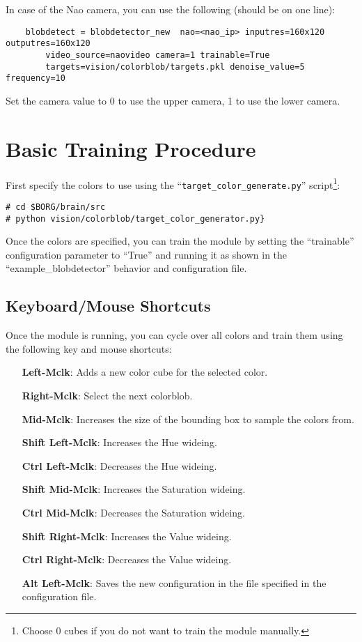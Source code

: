 \documentclass[a4paper, 10pt]{article}
\begin{document}
In case of the Nao camera, you can use the following (should be on one line):
\begin{lstlisting}
    blobdetect = blobdetector_new  nao=<nao_ip> inputres=160x120 outputres=160x120 
        video_source=naovideo camera=1 trainable=True 
        targets=vision/colorblob/targets.pkl denoise_value=5 frequency=10
\end{lstlisting}

Set the camera value to 0 to use the upper camera, 1 to use the lower camera.

\section{Basic Training Procedure}
\label{sec:training}

First specify the colors to use using the ``\lstinline{target_color_generate.py}'' script\footnote{Choose 0 cubes if you do not want to train the module manually.}:
\begin{lstlisting}
# cd $BORG/brain/src
# python vision/colorblob/target_color_generator.py}
\end{lstlisting}

Once the colors are specified, you can train the module by setting the ``trainable'' configuration parameter to ``True'' and running it as shown in the ``example\_blobdetector'' behavior and configuration file.

\subsection{Keyboard/Mouse Shortcuts}

Once the module is running, you can cycle over all colors and train them using the following key and mouse shortcuts:

\begin{enumerate}
    \item[\textbf{Left-Mclk}:] Adds a new color cube for the selected color.
    \item[\textbf{Right-Mclk}:] Select the next colorblob.
    \item[\textbf{Mid-Mclk}:] Increases the size of the bounding box to sample the colors from.
    \item[\textbf{Shift Left-Mclk}:] Increases the Hue wideing.
    \item[\textbf{Ctrl Left-Mclk}:] Decreases the Hue wideing.
    \item[\textbf{Shift Mid-Mclk}:] Increases the Saturation wideing.
    \item[\textbf{Ctrl Mid-Mclk}:] Decreases the Saturation wideing.
    \item[\textbf{Shift Right-Mclk}:] Increases the Value wideing.
    \item[\textbf{Ctrl Right-Mclk}:] Decreases the Value wideing.
    \item[\textbf{Alt Left-Mclk}:] Saves the new configuration in the file specified in the configuration file.
\end{enumerate}
\end{document}
